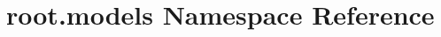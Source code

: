 \hypertarget{namespaceroot_1_1models}{\section{root.\-models Namespace Reference}
\label{namespaceroot_1_1models}
}
